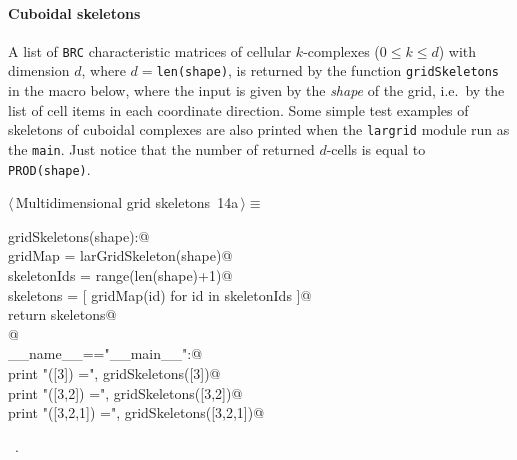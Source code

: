 \documentclass[11pt,oneside]{article}	%
\begin{document}
\paragraph{Cuboidal skeletons}
A list of \texttt{BRC} characteristic matrices of cellular $k$-complexes ($0\leq k\leq d$) with dimension $d$, where $d={}$\texttt{len(shape)}, is returned by the function \texttt{gridSkeletons} in the macro below, where the input is given by the \emph{shape} of the grid, i.e.~by the list of cell items in each coordinate direction. Some simple test examples of skeletons of cuboidal complexes are also printed when the \texttt{largrid} module run as the \texttt{main}. Just notice that the number of returned $d$-cells is equal to \texttt{PROD(shape)}.

\begin{flushleft} \small \label{scrap18}
\protect{}$\langle\,$Multidimensional grid skeletons\nobreak\ {\footnotesize 14a}$\,\rangle\equiv$
\vspace{-1ex}
\begin{list}{}{} \item
\mbox{}\verb@def gridSkeletons(shape):@\\
\mbox{}\verb@   gridMap = larGridSkeleton(shape)@\\
\mbox{}\verb@   skeletonIds = range(len(shape)+1)@\\
\mbox{}\verb@   skeletons = [ gridMap(id) for id in skeletonIds ]@\\
\mbox{}\verb@   return skeletons@\\
\mbox{}\verb@   @\\
\mbox{}\verb@if __name__=="__main__":@\\
\mbox{}\verb@   print "\ngridSkeletons([3]) =\n", gridSkeletons([3])@\\
\mbox{}\verb@   print "\ngridSkeletons([3,2]) =\n", gridSkeletons([3,2])@\\
\mbox{}\verb@   print "\ngridSkeletons([3,2,1]) =\n", gridSkeletons([3,2,1])@\\
\mbox{}\verb@@{\NWsep}
\end{list}
\vspace{-1ex}
\footnotesize\addtolength{\baselineskip}{-1ex}
\begin{list}{}{\setlength{\itemsep}{-\parsep}\setlength{\itemindent}{-\leftmargin}}
\item \NWtxtMacroRefIn\ .
\end{list}
\end{flushleft}
\end{document}
